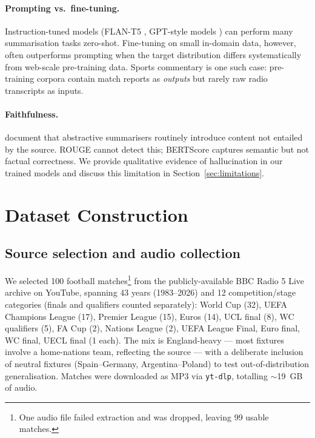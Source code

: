 \documentclass[10pt,a4paper]{article}
\begin{document}
\paragraph{Prompting vs.\ fine-tuning.}
Instruction-tuned models (FLAN-T5 \citep{chung2022flan}, GPT-style models \citep{brown2020gpt3}) can perform many summarisation tasks zero-shot. Fine-tuning on small in-domain data, however, often outperforms prompting when the target distribution differs systematically from web-scale pre-training data. Sports commentary is one such case: pre-training corpora contain match reports as \emph{outputs} but rarely raw radio transcripts as inputs.

\paragraph{Faithfulness.}
\citet{maynez2020faithfulness} document that abstractive summarisers routinely introduce content not entailed by the source. ROUGE \citep{lin2004rouge} cannot detect this; BERTScore \citep{zhang2020bertscore} captures semantic but not factual correctness. We provide qualitative evidence of hallucination in our trained models and discuss this limitation in Section~\ref{sec:limitations}.

\section{Dataset Construction}
\label{sec:dataset}

\subsection{Source selection and audio collection}
We selected 100 football matches\footnote{One audio file failed extraction and was dropped, leaving 99 usable matches.} from the publicly-available BBC Radio 5 Live archive on YouTube, spanning 43 years (1983--2026) and 12 competition/stage categories (finals and qualifiers counted separately): World Cup (32), UEFA Champions League (17), Premier League (15), Euros (14), UCL final (8), WC qualifiers (5), FA Cup (2), Nations League (2), UEFA League Final, Euro final, WC final, UECL final (1 each). The mix is England-heavy --- most fixtures involve a home-nations team, reflecting the source --- with a deliberate inclusion of neutral fixtures (Spain--Germany, Argentina--Poland) to test out-of-distribution generalisation. Matches were downloaded as MP3 via \texttt{yt-dlp}, totalling $\sim$19~GB of audio.
\end{document}
